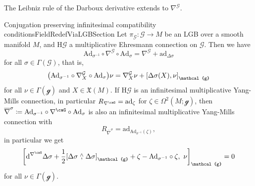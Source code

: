 \documentclass[reqno,a4paper,oneside]{amsart}
\theoremstyle{plain}
\theoremstyle{remark}
\theoremstyle{definition}
\begin{document}
The Leibniz rule of the Darboux derivative extends to $\nabla^{\mathcal{G}}$.

\begin{lemmata}{Conjugation preserving infinitesimal compatibility conditions}{FieldRedefViaLGBSection}
Let $\pi_{\mathcal{G}} \colon \mathcal{G} \to M$ be an LGB over a smooth manifold $M$, and $\mathrm{H}\mathcal{G}$ a multiplicative Ehresmann connection on $\mathcal{G}$. Then we have
\begin{equation}\label{SpecialFieldRedef}
\mathrm{Ad}_{\sigma^{-1}} \circ \nabla^{\mathcal{G}} \circ \mathrm{Ad}_\sigma
=
\nabla^{\mathcal{G}}
	+ \mathrm{ad}_{\Delta \sigma}
\end{equation}
for all $\sigma \in \Gamma(\mathcal{G})$, that is,
\begin{equation*}
\mleft(\mathrm{Ad}_{\sigma^{-1}} \circ \nabla^{\mathcal{G}}_X \circ \mathrm{Ad}_\sigma\mright)\nu
=
\nabla^{\mathcal{G}}_X\nu
	+ \mleft[ \Delta\sigma(X), \nu \mright]_{\mathcal{g}}
\end{equation*}
for all $\nu \in \Gamma(\mathcal{g})$ and $X \in \mathfrak{X}(M)$.
If $\mathrm{H}\mathcal{G}$ is an infinitesimal multiplicative Yang-Mills connection, in particular $R_{\nabla^\caG} = \mathrm{ad}_\zeta$ for $\zeta \in \Omega^2(M; \mathcal{g})$, then $\overline{\nabla}^\sigma \coloneqq \mathrm{Ad}_{\sigma^{-1}} \circ \nabla^\caG \circ \mathrm{Ad}_\sigma$ is also an infinitesimal multiplicative Yang-Mills connection with
\begin{equation*}
R_{\overline{\nabla}^\sigma}
=
\mathrm{ad}_{\mathrm{Ad}_{\sigma^{-1}}(\zeta)},
\end{equation*}
in particular we get
\begin{equation}\label{AlmostGeneralizedMaurerCartanEquation}
\mleft[ \mathrm{d}^{\nabla^\caG} \Delta \sigma + \frac{1}{2} \mleft[ \Delta \sigma \stackrel{\wedge}{,} \Delta\sigma \mright]_{\mathcal{g}} + \zeta - \mathrm{Ad}_{\sigma^{-1}} \circ \zeta, ~ \nu \mright]_{\mathcal{g}}
=
0
\end{equation}
for all $\nu \in \Gamma(\mathcal{g})$.
\end{lemmata}
\end{document}

